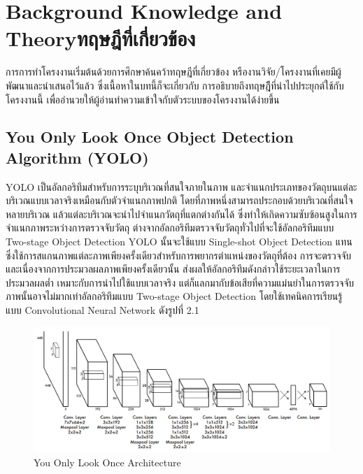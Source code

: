 \chapter{\ifenglish Background Knowledge and Theory\else ทฤษฎีที่เกี่ยวข้อง\fi}

การการทําโครงงานเริ่มต้นด้วยการศึกษาค้นคว้าทฤษฎีที่เกี่ยวข้อง หรืองานวิจัย/โครงงานที่เคยมีผู้พัฒนาและนําเสนอไว้แล้ว ซึ่งเนื้อหาในบทนี้ก็จะเกี่ยวกับ
การอธิบายถึงทฤษฎีีที่นำไปประยุกต์ใช้กับโครงงานนี้ เพื่ออำนวยให้ผู้อ่านทำความเข้าใจกับตัวระบบของโครงงานได้ง่ายขึ้น

\section{You Only Look Once Object Detection Algorithm (YOLO)}
YOLO \cite{yolo} เป็นอัลกอริทึมสำหรับการระบุบริเวณที่สนใจภายในภาพ และจำแนกประเภทของวัตถุบนแต่ละบริเวณแบบเวลาจริงเหมือนกับตัวจำแนกภาพปกติ 
โดยที่ภาพหนึ่งสามารถประกอบด้วยบริเวณที่สนใจหลายบริเวณ แล้วแต่ละบริเวณจะนำไปจำแนกวัตถุที่แตกต่างกันได้ ซึ่งทำให้เกิดความซับซ้อนสูงในการ
จำแนกภาพระหว่างการตรวจจับวัตถุ ต่างจากอัลกอริทึมตรวจจับวัตถุทั่วไปที่จะใช้อัลกอริทึมแบบ Two-stage Object Detection YOLO 
นั้นจะใช้แบบ Single-shot Object Detection แทน ซึ่งใช้การสแกนภาพแต่ละภาพเพียงครั้งเดียวสำหรับการพยากรตำแหน่งของวัตถุที่ต้อง
การจะตรวจจับ และเนื่องจากการประมวลผลภาพเพียงครั้งเดียวนั้น ส่งผลให้อัลกอริทึมดังกล่าวใช้ระยะเวลาในการประมวลผลต่ำ 
เหมาะกับการนำไปใช้แบบเวลาจริง แต่ก็แลกมากับข้อเสียที่ความแม่นยำในการตรวจจับภาพนั้นอาจไม่มากเท่าอัลกอริทึมแบบ Two-stage Object Detection 
โดยใช้เทคนิคการเรียนรู้แบบ Convolutional Neural Network ดังรูปที่ 2.1
\begin{figure}[h]
  \begin{center}
  \includegraphics[scale=0.2]{resources/YOLO.png}
  \end{center}
  \caption[YOLO Architecture]{You Only Look Once Architecture}
  \label{fig:yolo architecture}
\end{figure}


